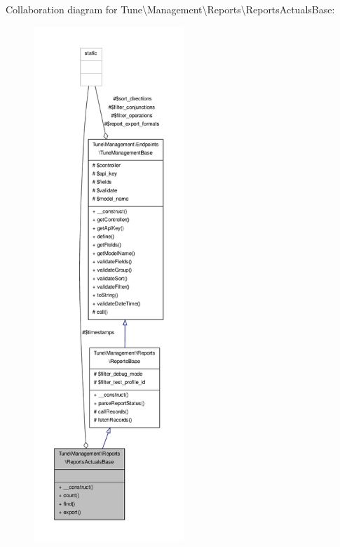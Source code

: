 Collaboration diagram for Tune\textbackslash{}Management\textbackslash{}Reports\textbackslash{}Reports\-Actuals\-Base\-:
\nopagebreak
\begin{figure}[H]
\begin{center}
\leavevmode
\includegraphics[height=550pt]{classTune_1_1Management_1_1Reports_1_1ReportsActualsBase__coll__graph}
\end{center}
\end{figure}
